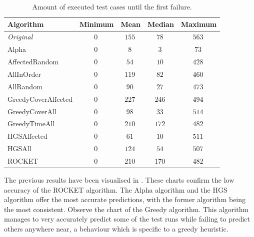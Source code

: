 \begin{table}[h]
	\centering
	\begin{tabularx}{\textwidth}{|X||c|c|c|c|}
		\hline
		\textbf{Algorithm} & \textbf{Minimum} & \textbf{Mean} & \textbf{Median} & \textbf{Maximum}\\
		
		\hline
		
		\emph{Original} & $\SI{0}{}$ & $\SI{155}{}$ & $\SI{78}{}$ & $\SI{563}{}$\\
		
		\hline
		
		Alpha & $\SI{0}{}$ & $\SI{8}{}$ & $\SI{3}{}$ & $\SI{73}{}$\\
		
		\hline
		AffectedRandom & $\SI{0}{}$ & $\SI{54}{}$ & $\SI{10}{}$ & $\SI{428}{}$\\
		AllInOrder & $\SI{0}{}$ & $\SI{119}{}$ & $\SI{82}{}$ & $\SI{460}{}$\\
		AllRandom & $\SI{0}{}$ & $\SI{90}{}$ & $\SI{27}{}$ & $\SI{473}{}$\\
		
		\hline
		
		GreedyCoverAffected & $\SI{0}{}$ & $\SI{227}{}$ & $\SI{246}{}$ & $\SI{494}{}$\\
		GreedyCoverAll & $\SI{0}{}$ & $\SI{98}{}$ & $\SI{33}{}$ & $\SI{514}{}$\\
		GreedyTimeAll & $\SI{0}{}$ & $\SI{210}{}$ & $\SI{172}{}$ & $\SI{482}{}$\\
		
		\hline
		
		HGSAffected & $\SI{0}{}$ & $\SI{61}{}$ & $\SI{10}{}$ & $\SI{511}{}$\\
		HGSAll & $\SI{0}{}$ & $\SI{124}{}$ & $\SI{54}{}$ & $\SI{507}{}$\\
		
		\hline
		
		ROCKET & $\SI{0}{}$ & $\SI{210}{}$ & $\SI{170}{}$ & $\SI{482}{}$\\
		
		\hline
	\end{tabularx}
	\caption{Amount of executed test cases until the first failure.}
	\label{tbl:rq4-first-failure}
\end{table}

\noindent The previous results have been visualised in . These charts confirm the low accuracy of the ROCKET algorithm. The Alpha algorithm and the HGS algorithm offer the most accurate predictions, with the former algorithm being the most consistent. Observe the chart of the Greedy algorithm. This algorithm manages to very accurately predict some of the test runs while failing to predict others anywhere near, a behaviour which is specific to a greedy heuristic.\\

